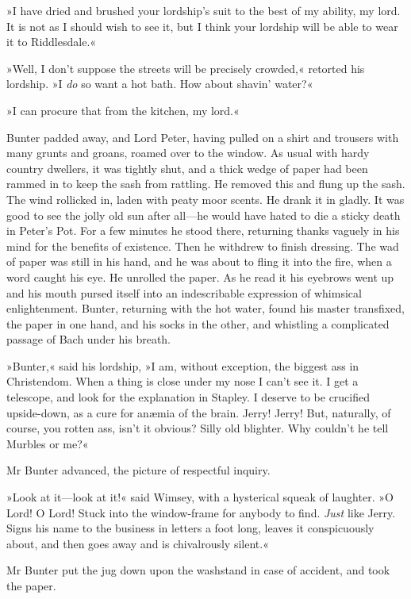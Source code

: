 »I have dried and brushed your lordship's suit to the best of my ability, my lord. It is not as I should wish to see it, but I think your lordship will be able to wear it to Riddlesdale.«

»Well, I don't suppose the streets will be precisely crowded,« retorted his lordship. »I \textit{do} so want a hot bath. How about shavin' water?«

»I can procure that from the kitchen, my lord.«

Bunter padded away, and Lord Peter, having pulled on a shirt and trousers with many grunts and groans, roamed over to the window. As usual with hardy country dwellers, it was tightly shut, and a thick wedge of paper had been rammed in to keep the sash from rattling. He removed this and flung up the sash. The wind rollicked in, laden with peaty moor scents. He drank it in gladly. It was good to see the jolly old sun after all—he would have hated to die a sticky death in Peter's Pot. For a few minutes he stood there, returning thanks vaguely in his mind for the benefits of existence. Then he withdrew to finish dressing. The wad of paper was still in his hand, and he was about to fling it into the fire, when a word caught his eye. He unrolled the paper. As he read it his eyebrows went up and his mouth pursed itself into an indescribable expression of whimsical enlightenment. Bunter, returning with the hot water, found his master transfixed, the paper in one hand, and his socks in the other, and whistling a complicated passage of Bach under his breath.

»Bunter,« said his lordship, »I am, without exception, the biggest ass in Christendom. When a thing is close under my nose I can't see it. I get a telescope, and look for the explanation in Stapley. I deserve to be crucified upside-down, as a cure for anæmia of the brain. Jerry!  Jerry! But, naturally, of course, you rotten ass, isn't it obvious?  Silly old blighter. Why couldn't he tell Murbles or me?«

Mr Bunter advanced, the picture of respectful inquiry.

»Look at it—look at it!« said Wimsey, with a hysterical squeak of laughter. »O Lord! O Lord! Stuck into the window-frame for anybody to find. \textit{Just} like Jerry. Signs his name to the business in letters a foot long, leaves it conspicuously about, and then goes away and is chivalrously silent.«

Mr Bunter put the jug down upon the washstand in case of accident, and took the paper.

